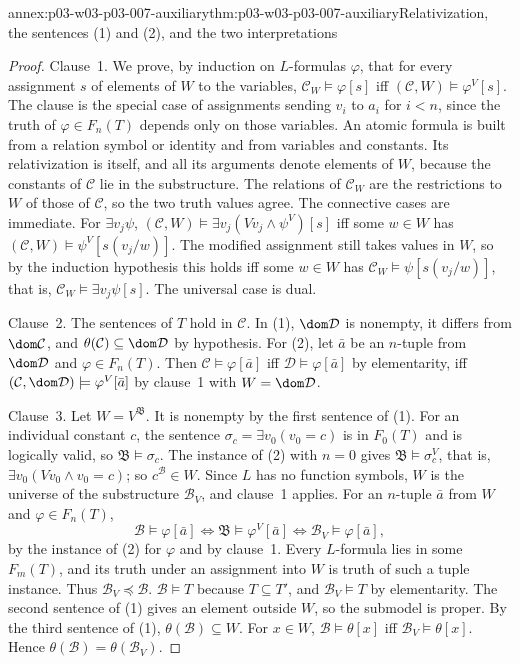 \begin{annexitem}{annex:p03-w03-p03-007-auxiliary}{thm:p03-w03-p03-007-auxiliary}{Relativization, the sentences (1) and (2), and the two interpretations}
\begin{proof}
Clause~1. We prove, by induction on \(L\)-formulas \(\varphi\), that for
every assignment \(s\) of elements of \(W\) to the variables,
\(\mathcal C_W\models\varphi[s]\) iff \((\mathcal C,W)\models\varphi^V[s]\).
The clause is the special case of assignments sending \(v_i\) to \(a_i\) for
\(i<n\), since the truth of \(\varphi\in F_n(T)\) depends only on those
variables. An atomic formula is built from a relation symbol or identity and
from variables and constants. Its relativization is itself, and all its
arguments denote elements of \(W\), because the constants of \(\mathcal C\)
lie in the substructure. The relations of \(\mathcal C_W\) are the
restrictions to \(W\) of those of \(\mathcal C\), so the two truth values
agree. The connective cases are immediate. For
\(\exists v_j\psi\), \((\mathcal C,W)\models\exists v_j(Vv_j\land\psi^V)[s]\)
iff some \(w\in W\) has \((\mathcal C,W)\models\psi^V[s(v_j/w)]\). The
modified assignment still takes values in \(W\), so by the induction
hypothesis this holds iff some \(w\in W\) has
\(\mathcal C_W\models\psi[s(v_j/w)]\), that is,
\(\mathcal C_W\models\exists v_j\psi[s]\). The universal case is dual.

Clause~2. The sentences of \(T\) hold in \(\mathcal C\). In (1),
\(\dom\mathcal D\) is nonempty, it differs from \(\dom\mathcal C\), and
\(\theta(\mathcal C)\subseteq\dom\mathcal D\) by hypothesis. For (2), let
\(\bar a\) be an \(n\)-tuple from \(\dom\mathcal D\) and
\(\varphi\in F_n(T)\). Then \(\mathcal C\models\varphi[\bar a]\) iff
\(\mathcal D\models\varphi[\bar a]\) by elementarity, iff
\((\mathcal C,\dom\mathcal D)\models\varphi^V[\bar a]\) by clause~1 with
\(W=\dom\mathcal D\).

Clause~3. Let \(W=V^{\mathfrak B}\). It is nonempty by the first sentence of
(1). For an individual constant \(c\), the sentence
\(\sigma_c=\exists v_0(v_0=c)\) is in \(F_0(T)\) and is logically valid, so
\(\mathfrak B\models\sigma_c\). The instance of (2) with \(n=0\) gives
\(\mathfrak B\models\sigma_c^V\), that is, \(\exists v_0(Vv_0\land v_0=c)\);
so \(c^{\mathcal B}\in W\). Since \(L\) has no function symbols, \(W\) is
the universe of the substructure \(\mathcal B_V\), and clause~1 applies. For
an \(n\)-tuple \(\bar a\) from \(W\) and \(\varphi\in F_n(T)\),
\[
 \mathcal B\models\varphi[\bar a]
 \iff\mathfrak B\models\varphi^V[\bar a]
 \iff\mathcal B_V\models\varphi[\bar a],
\]
by the instance of (2) for \(\varphi\) and by clause~1. Every \(L\)-formula
lies in some \(F_m(T)\), and its truth under an assignment into \(W\) is
truth of such a tuple instance. Thus \(\mathcal B_V\preccurlyeq\mathcal B\).
\(\mathcal B\models T\) because \(T\subseteq T'\), and \(\mathcal B_V\models T\)
by elementarity. The second sentence of (1) gives an element outside \(W\),
so the submodel is proper. By the third sentence of (1),
\(\theta(\mathcal B)\subseteq W\). For \(x\in W\),
\(\mathcal B\models\theta[x]\) iff \(\mathcal B_V\models\theta[x]\). Hence
\(\theta(\mathcal B)=\theta(\mathcal B_V)\).


\end{proof}
\end{annexitem}
